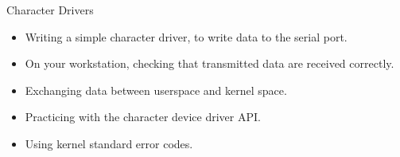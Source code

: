 \setuplabframe
{Character Drivers}
{
  \begin{itemize}
  \item Writing a simple character driver, to write data to the serial
    port.
  \item On your workstation, checking that transmitted data are
    received correctly.
  \item Exchanging data between userspace and kernel space.
  \item Practicing with the character device driver API.
  \item Using kernel standard error codes.
  \end{itemize}
}
